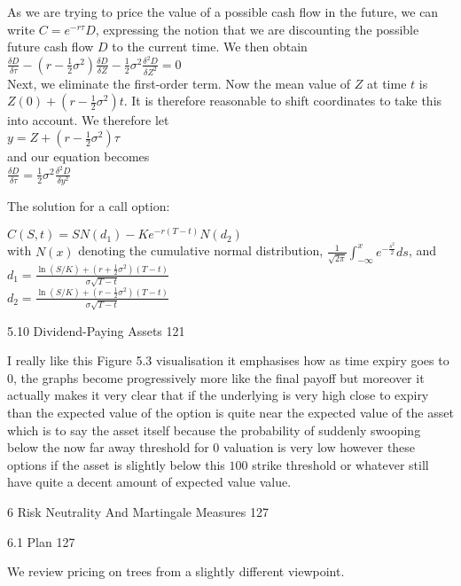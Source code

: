 As we are trying to price the value of a possible cash flow in the future, we can write $C = e^{-r \tau} D$, expressing the notion that we are discounting the possible future cash flow $D$ to the current time. We then obtain \\
$\frac{\delta D}{\delta \tau} - \left( r-\frac{1}{2} \sigma^2  \right) \frac{\delta D}{\delta Z} - \frac{1}{2} \sigma^2 \frac{\delta^2 D}{\delta Z^2} = 0$ \\
Next, we eliminate the first-order term. Now the mean value of $Z$ at time $t$ is $Z(0)+\left( r-\frac{1}{2} \sigma^2 \right) t$. It is therefore reasonable to shift coordinates to take this into account. We therefore let \\
$y = Z + \left( r-\frac{1}{2} \sigma^2 \right) \tau$ \\
and our equation becomes \\
$\frac{\delta D}{\delta \tau} = \frac{1}{2} \sigma^2 \frac{\delta^2 D}{\delta y^2}$

The solution for a call option:

$C(S,t) = SN (d_1) - K e^{-r(T-t)} N(d_2)$ \\
with $N(x)$ denoting the cumulative normal distribution, $\frac{1}{\sqrt{2 \pi}} \int_{-\infty}^x e^{-\frac{s^2}{2}} ds$, and \\
$d_1 = \frac{\ln (S/K) + \left( r+\frac{1}{2}\sigma^2 \right)(T-t)}{\sigma \sqrt{T - t}}$ \\
$d_2 = \frac{\ln (S/K) + \left( r-\frac{1}{2}\sigma^2 \right)(T-t)}{\sigma \sqrt{T - t}}$

5.10 Dividend-Paying Assets 121

I really like this Figure 5.3 visualisation it emphasises how as time expiry goes to $0$, the graphs become progressively more like the final payoff but moreover it actually makes it very clear that if the underlying is very high close to expiry than the expected value of the option is quite near the expected value of the asset which is to say the asset itself because the probability of suddenly swooping below the now far away threshold for $0$ valuation is very low however these options if the asset is slightly below this $100$ strike threshold or whatever still have quite a decent amount of expected value value.

6 Risk Neutrality And Martingale Measures 127



6.1 Plan 127

We review pricing on trees from a slightly different viewpoint.

